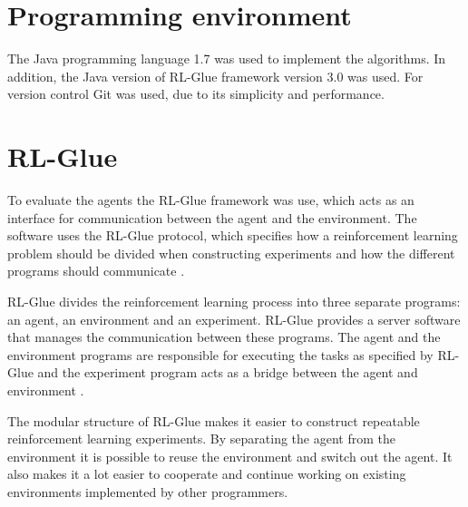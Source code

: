 \section{Programming environment}
\label{sec:prog_env}

The Java programming language 1.7 was used to implement the algorithms. In addition, the
Java version of RL-Glue framework version 3.0 was used. For version control Git
was used, due to its simplicity and performance.

\section{RL-Glue}
\label{sec:rl_glue}

To evaluate the agents the RL-Glue framework was use, which acts as an
interface for communication between the agent and the environment. The software
uses the RL-Glue protocol, which specifies how a reinforcement learning problem
should be divided when constructing experiments and how the different programs
should communicate \parencite{tanner2009rl}.

RL-Glue divides the reinforcement learning process into three separate
programs: an agent, an environment and an experiment. RL-Glue provides a server
software that manages the communication between these programs. The agent and
the environment programs are responsible for executing the tasks as specified
by RL-Glue and the experiment program acts as a bridge between the agent and
environment \parencite{tanner2009rl}.

The modular structure of RL-Glue makes it easier to construct repeatable
reinforcement learning experiments. By separating the agent from the
environment it is possible to reuse the environment and switch out the agent.
It also makes it a lot easier to cooperate and continue working on existing
environments implemented by other programmers.
